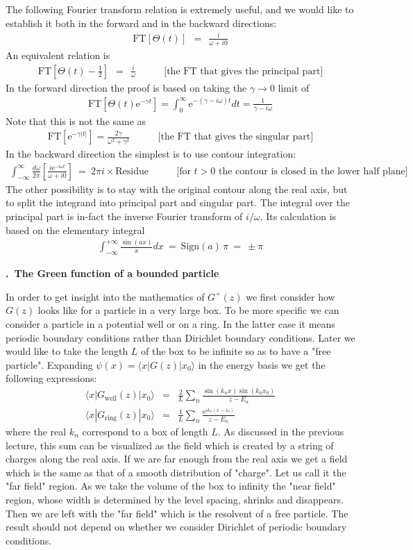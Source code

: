 \documentclass[onecolumn,fleqn, 11pt]{revtex4}
\newcommand{\eexp}{\mathrm{e}^}
\newcommand{\tbox}[1]{\text{#1}}
\newcommand{\beq}{\begin{eqnarray}}
\newcommand{\eeq}{\end{eqnarray}}
\renewcommand{\thesubsection}{\arabic{subsection}}
\renewcommand{\thesubsubsection}{\arabic{subsubsection}}
\newcommand{\sheadC}[1]
{
\addtocounter{subsubsection}{1}
\vspace{5mm}
{\bf \thesubsection.\thesubsubsection \ #1}  
\nopagebreak
\phantomsection
}
\begin{document}
The following Fourier transform relation is extremely useful, 
and we would like to establish it both in the forward and in 
the backward directions:
\beq
\mbox{FT}\left[ \Theta(t) \right] \ \ = \ \ \frac{i}{\omega+i0} 
\eeq
An equivalent relation is  
\beq
\mbox{FT}\left[ \Theta(t)-\frac{1}{2} \right] \ \ = \ \ \frac{i}{\omega} 
\ \ \ \ \ \ \ \ \ \ \ \ \
\mbox{[the FT that gives the principal part]} 
\eeq
In the forward direction the proof is based on 
taking the $\gamma\rightarrow0$ limit of 
\beq
\mbox{FT}\left[ \Theta(t)\eexp{-\gamma t} \right]
= \int_{0}^{\infty}\eexp{-(\gamma-i\omega) t} dt 
= \frac{1}{\gamma-i\omega} 
\eeq
Note that this is not the same as 
\beq
\mbox{FT}\left[ \eexp{-\gamma |t|} \right]
= \frac{2\gamma}{\omega^2+\gamma^2} 
\ \ \ \ \ \ \ \ \ \ \ \ \
\mbox{[the FT that gives the singular part]} 
\eeq
In the backward direction the simplest is to use contour integration:
\beq
\int_{-\infty}^{\infty}\frac{d\omega}{2\pi} \left[\frac{i \eexp{-i\omega t}}{\omega+i0}\right] 
\ = \ 2\pi i \times \mbox{Residue}
\ \ \ \ \ \ \ \ \ \ \ \ \
\mbox{[for $t>0$ the contour is closed in the lower half plane]} 
\eeq
The other possibility is to stay with the original contour 
along the real axis, but to split the integrand into principal part 
and singular part. The integral over the principal part is in-fact 
the inverse Fourier transform of $i/\omega$. Its calculation is 
based on the elementary integral  
\beq
\int_{-\infty}^{+\infty} \frac{\sin(ax)}{x}dx \ = \ \mbox{Sign}(a) \, \pi  \ = \ \pm\pi
\eeq
 


 
\sheadC{The Green function of a bounded particle}


In order to get insight into the mathematics 
of $G^{+}(z)$ we first consider how $G(z)$ looks 
like for a particle in a very large box.
To be more specific we can consider a particle 
in a potential well or on a ring. In the latter case 
it means periodic boundary conditions rather 
than Dirichlet boundary conditions.  
Later we would like to take the length $L$ 
of the box to be infinite so as to have a "free particle". 
Expanding ${\psi(x)=\langle x|G(z)|x_0 \rangle}$ 
in the energy basis we get the 
following expressions:  
\beq
\langle x|G_{\tbox{well}}(z)|x_0\rangle &=& 
\frac{2}{L}\sum_n \frac{\sin(k_n x)\sin(k_n x_0)}{z-E_n} 
\\ \nonumber
\langle x|G_{\tbox{ring}}(z)|x_0\rangle &=& 
\frac{1}{L}\sum_n \frac{\eexp{ik_n(x-x_0)}}{z-E_n}
\eeq
where the real $k_n$ correspond 
to a box of length $L$. 
As discussed in the previous lecture, 
this sum can be visualized as  
the field which is created 
by a string of charges along the real axis. 
If we are far enough from the real axis 
we get a field which is the same as 
that of a smooth distribution of "charge". 
Let us call it the "far field" region.
As we take the volume of the box to infinity 
the "near field" region, whose width 
is determined by the level spacing, 
shrinks and disappears. Then we are left  
with the "far field" which is the resolvent of a free particle.
The result should not depend on whether 
we consider Dirichlet of periodic boundary conditions.  
\end{document}
